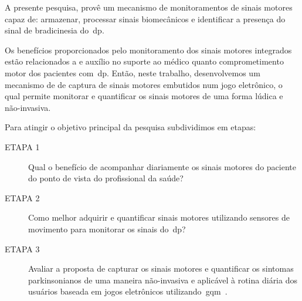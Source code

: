 A presente pesquisa, provê um mecanismo de monitoramentos de sinais motores capaz de: armazenar, processar sinais biomecânicos e identificar a presença do sinal de bradicinesia do~\ac{dp}. 




Os benefícios proporcionados pelo monitoramento dos sinais motores integrados estão relacionados a e auxílio no suporte ao médico quanto comprometimento motor dos pacientes com~\ac{dp}. Então, neste trabalho, desenvolvemos um mecanismo de de captura de sinais motores embutidos num jogo eletrônico, o qual permite monitorar e quantificar os sinais motores de uma forma lúdica e não-invasiva.

Para atingir o objetivo principal da pesquisa subdividimos em etapas:
	\begin{description}
	\item[ETAPA 1] Qual o benefício de acompanhar diariamente os sinais motores do paciente do ponto de vista do profissional da saúde?
	\item[ETAPA 2] Como melhor adquirir e quantificar sinais motores utilizando sensores de movimento para monitorar os sinais do~\ac{dp}?
	\item[ETAPA 3] Avaliar a proposta de capturar os sinais motores e quantificar os sintomas parkinsonianos de uma maneira não-invasiva e aplicável à rotina diária dos usuários baseada em jogos eletrônicos utilizando~\ac{gqm}~\cite{van1999goal}.
	\end{description}


	
